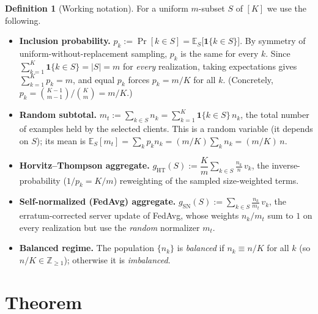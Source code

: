 \documentclass[11pt]{article}
\theoremstyle{definition}
\newtheorem{definition}[theorem]{Definition}
\theoremstyle{remark}
\begin{document}
\begin{definition}[Working notation]
For a uniform $m$-subset $S$ of $[K]$ we use the following.
\begin{itemize}
  \item \textbf{Inclusion probability.} $p_k:=\Pr[k\in S]=\mathbb{E}_S\big[\mathbf 1\{k\in S\}\big]$. By symmetry of uniform-without-replacement sampling, $p_k$ is the same for every $k$. Since $\sum_{k=1}^{K}\mathbf 1\{k\in S\}=|S|=m$ for \emph{every} realization, taking expectations gives $\sum_{k=1}^{K}p_k=m$, and equal $p_k$ forces $p_k=m/K$ for all $k$. (Concretely, $p_k=\binom{K-1}{m-1}/\binom{K}{m}=m/K$.)
  \item \textbf{Random subtotal.} $m_t:=\sum_{k\in S}n_k=\sum_{k=1}^{K}\mathbf 1\{k\in S\}\,n_k$, the total number of examples held by the selected clients. This is a random variable (it depends on $S$); its mean is $\mathbb{E}_S[m_t]=\sum_k p_k n_k=(m/K)\sum_k n_k=(m/K)\,n$.
  \item \textbf{Horvitz--Thompson aggregate.} $g_{\mathrm{HT}}(S):=\dfrac{K}{m}\displaystyle\sum_{k\in S}\frac{n_k}{n}\,v_k$, the inverse-probability ($1/p_k=K/m$) reweighting of the sampled size-weighted terms.
  \item \textbf{Self-normalized (FedAvg) aggregate.} $g_{\mathrm{SN}}(S):=\displaystyle\sum_{k\in S}\frac{n_k}{m_t}\,v_k$, the erratum-corrected server update of FedAvg, whose weights $n_k/m_t$ sum to $1$ on every realization but use the \emph{random} normalizer $m_t$.
  \item \textbf{Balanced regime.} The population $\{n_k\}$ is \emph{balanced} if $n_k\equiv n/K$ for all $k$ (so $n/K\in\mathbb{Z}_{\ge 1}$); otherwise it is \emph{imbalanced}.
\end{itemize}
\end{definition}

\section*{Theorem}
\end{document}
